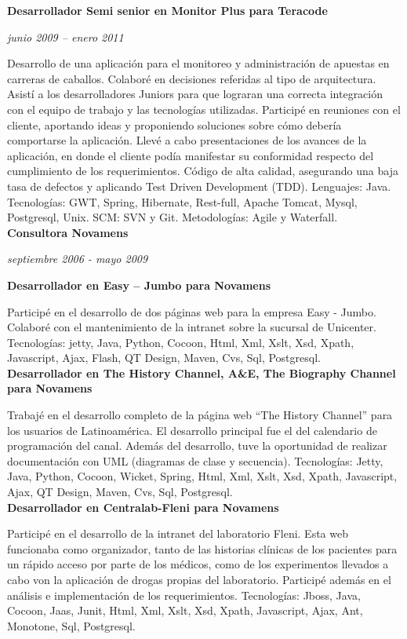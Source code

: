 \documentclass[a4paper,11pt]{article}
\begin{document}
\noindent \textbf{Desarrollador Semi senior en Monitor Plus para Teracode}

\noindent \emph{junio 2009 –  enero 2011}

\noindent Desarrollo de una aplicación para el monitoreo y administración de
apuestas en carreras de caballos.  Colaboré en decisiones referidas al tipo de
arquitectura.
Asistí a los desarrolladores Juniors para que lograran una correcta integración
con el equipo de trabajo y las tecnologías utilizadas.  Participé en reuniones
con el cliente, aportando ideas y proponiendo soluciones sobre cómo debería
comportarse la aplicación.
Llevé a cabo presentaciones de los avances de la aplicación, en donde el
cliente podía manifestar su conformidad respecto del cumplimiento de los
requerimientos.  Código de alta calidad, asegurando una baja tasa de defectos y
aplicando Test Driven Development (TDD).
Lenguajes: Java.
Tecnologías: GWT, Spring, Hibernate, Rest-full, Apache Tomcat, Mysql,
Postgresql, Unix.  SCM: SVN y Git.
Metodologías: Agile y Waterfall. \\


\noindent \textbf{Consultora Novamens}

\noindent \emph{septiembre 2006 - mayo 2009}

\noindent \textbf{Desarrollador en Easy – Jumbo para Novamens}

\noindent Participé en el desarrollo de dos páginas web para la empresa Easy -
Jumbo.  Colaboré con el mantenimiento de la intranet sobre la sucursal de
Unicenter.
Tecnologías: jetty, Java, Python, Cocoon, Html, Xml, Xslt, Xsd, Xpath,
Javascript, Ajax, Flash, QT Design, Maven, Cvs, Sql, Postgresql. \\

\noindent \textbf{Desarrollador en The History Channel, A\&E, The Biography
Channel para Novamens}

\noindent Trabajé en el desarrollo completo de la página web “The History
Channel” para los usuarios de Latinoamérica. El desarrollo principal fue el del
calendario de programación del canal.  Además del desarrollo, tuve la
oportunidad de realizar documentación con UML (diagramas de clase y secuencia).
Tecnologías: Jetty, Java, Python, Cocoon, Wicket, Spring, Html, Xml, Xslt, Xsd,
Xpath, Javascript, Ajax, QT Design, Maven, Cvs, Sql, Postgresql. \\

\noindent \textbf{Desarrollador en Centralab-Fleni para Novamens}

\noindent Participé en el desarrollo de la intranet del laboratorio Fleni. Esta
web funcionaba como organizador, tanto de las historias clínicas de los
pacientes para un rápido acceso por parte de los médicos, como de los
experimentos llevados a cabo von la aplicación de drogas propias del
laboratorio. Participé además en el análisis e implementación de los
requerimientos.  Tecnologías: Jboss, Java, Cocoon, Jaas, Junit, Html, Xml,
Xslt, Xsd, Xpath, Javascript, Ajax, Ant, Monotone, Sql, Postgresql. \\
\end{document}
